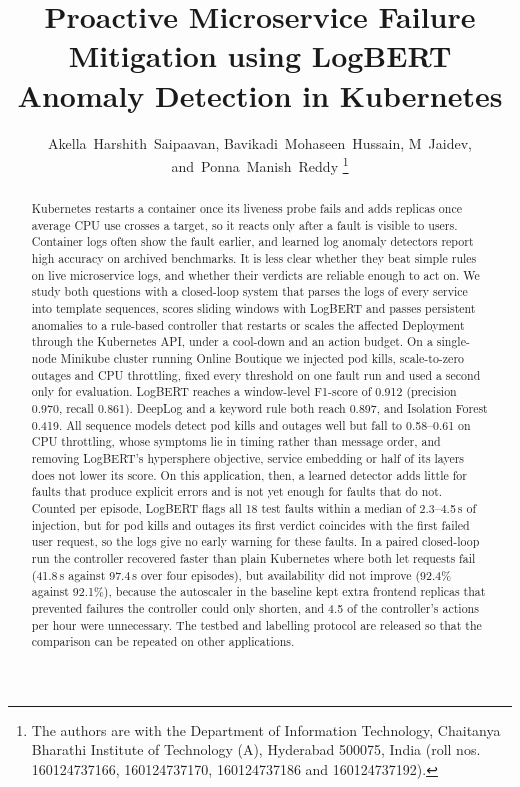 \documentclass[journal]{IEEEtran}
\begin{document}
\title{Proactive Microservice Failure Mitigation using LogBERT Anomaly Detection in Kubernetes}

\author{Akella~Harshith~Saipaavan,
        Bavikadi~Mohaseen~Hussain,
        M~Jaidev,
        and~Ponna~Manish~Reddy%
\thanks{The authors are with the Department of Information Technology, Chaitanya Bharathi Institute of Technology (A), Hyderabad 500075, India (roll nos. 160124737166, 160124737170, 160124737186 and 160124737192).}}


\maketitle

\begin{abstract}
Kubernetes restarts a container once its liveness probe fails and adds replicas once average CPU use crosses a target, so it reacts only after a fault is visible to users. Container logs often show the fault earlier, and learned log anomaly detectors report high accuracy on archived benchmarks. It is less clear whether they beat simple rules on live microservice logs, and whether their verdicts are reliable enough to act on. We study both questions with a closed-loop system that parses the logs of every service into template sequences, scores sliding windows with LogBERT and passes persistent anomalies to a rule-based controller that restarts or scales the affected Deployment through the Kubernetes API, under a cool-down and an action budget. On a single-node Minikube cluster running Online Boutique we injected pod kills, scale-to-zero outages and CPU throttling, fixed every threshold on one fault run and used a second only for evaluation. LogBERT reaches a window-level F1-score of 0.912 (precision 0.970, recall 0.861). DeepLog and a keyword rule both reach 0.897, and Isolation Forest 0.419. All sequence models detect pod kills and outages well but fall to 0.58--0.61 on CPU throttling, whose symptoms lie in timing rather than message order, and removing LogBERT's hypersphere objective, service embedding or half of its layers does not lower its score. On this application, then, a learned detector adds little for faults that produce explicit errors and is not yet enough for faults that do not. Counted per episode, LogBERT flags all 18 test faults within a median of 2.3--4.5\,s of injection, but for pod kills and outages its first verdict coincides with the first failed user request, so the logs give no early warning for these faults. In a paired closed-loop run the controller recovered faster than plain Kubernetes where both let requests fail (41.8\,s against 97.4\,s over four episodes), but availability did not improve (92.4\% against 92.1\%), because the autoscaler in the baseline kept extra frontend replicas that prevented failures the controller could only shorten, and 4.5 of the controller's actions per hour were unnecessary. The testbed and labelling protocol are released so that the comparison can be repeated on other applications.
\end{abstract}
\end{document}

